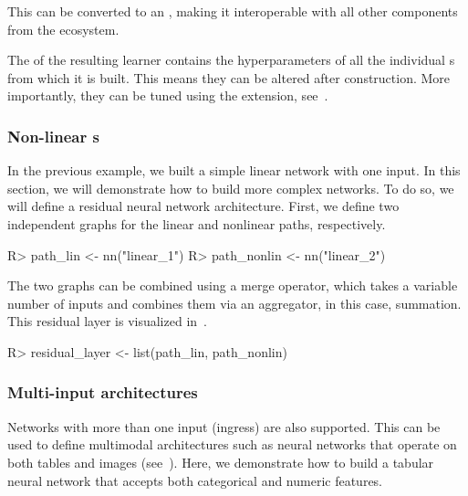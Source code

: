 \documentclass[article]{jss}
\theoremstyle{definition}
\begin{document}
This  can be converted to an , making it interoperable with all other components from the  ecosystem.


The  of the resulting learner contains the hyperparameters of all the individual s from which it is built.
This means they can be altered after construction.
More importantly, they can be tuned using the  extension, see~.

\subsubsection[Non-linear Graphs]{Non-linear s}\label{sec:complex-architectures}

In the previous example, we built a simple linear network with one input.
In this section, we will demonstrate how to build more complex networks.
To do so, we will define a residual neural network architecture.
First, we define two independent graphs for the linear and nonlinear paths, respectively.

\begin{CodeInput}
R> path_lin <- nn("linear_1")
R> path_nonlin <- nn("linear_2") %
\end{CodeInput}

The two graphs can be combined using a merge operator, which takes a variable number of inputs and combines them via an aggregator, in this case, summation.
This residual layer is visualized in~.

\begin{CodeInput}
R> residual_layer <- list(path_lin, path_nonlin) %
\end{CodeInput}

\subsubsection{Multi-input architectures}

Networks with more than one input (ingress) are also supported.
This can be used to define multimodal architectures such as neural networks that operate on both tables and images (see~).
Here, we demonstrate how to build a tabular neural network that accepts both categorical and numeric features.
\end{document}
